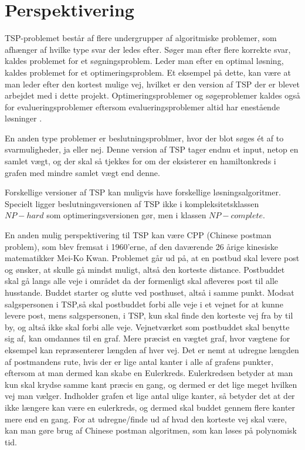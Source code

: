 \chapter{Perspektivering}
TSP-problemet består af flere undergrupper af algoritmiske problemer, som afhænger af hvilke type svar der ledes efter. Søger man efter flere korrekte svar, kaldes problemet for et søgningsproblem. Leder man efter en optimal løsning, kaldes problemet for et optimeringsproblem. Et eksempel på dette, kan være at man leder efter den kortest mulige vej, hvilket er den version af TSP der er blevet arbejdet med i dette projekt. Optimeringsproblemer og søgeproblemer kaldes også for evalueringsproblemer eftersom evalueringsproblemer altid har enestående løsninger .

En anden type problemer er beslutningsproblmer, hvor der blot søges ét af to svarmuligheder, ja eller nej. Denne version af TSP tager endnu et input, netop en samlet vægt, og der skal så tjekkes for om der eksisterer en hamiltonkreds i grafen med mindre samlet vægt end denne.

Forskellige versioner af TSP kan muligvis have forskellige løsningsalgoritmer. Specielt ligger beslutningsversionen af TSP ikke i kompleksitetsklassen $NP-hard$ som optimeringsversionen gør, men i klassen $NP-complete$.


En anden mulig perspektivering til TSP kan være CPP (Chinese postman problem), som blev fremsat i 1960'erne, af den daværende 26 årige kinesiske matematikker Mei-Ko Kwan. Problemet går ud på, at en postbud skal levere post og ønsker, at skulle gå mindst muligt, altså den korteste distance. Postbuddet skal gå langs alle veje i området da der formenligt skal afleveres post til alle husstande. Buddet starter og slutte ved posthuset,  altså i samme punkt. Modsat salgspersonen i TSP,så skal postbuddet  forbi alle veje i et vejnet for at kunne levere post, mens salgspersonen, i TSP, kun skal finde den korteste vej fra by til by, og altså ikke skal forbi alle veje. 
Vejnetværket som postbuddet skal benytte sig af, kan omdannes til en graf. Mere præcist en vægtet graf, hvor vægtene for eksempel kan repræsenterer længden af hver vej. 
Det er nemt at udregne længden af postmandens rute, hvis der er lige antal kanter i alle af grafens punkter, eftersom at man dermed kan skabe en Eulerkreds. Eulerkredsen betyder at man kun skal krydse samme kant præcis en gang, og dermed er det lige meget hvilken vej man vælger.   
Indholder grafen et lige antal ulige kanter, så betyder det at der ikke længere kan være en eulerkreds, og dermed skal buddet gennem flere kanter mere end en gang. For at udregne/finde ud af hvad den korteste vej skal være, kan man gøre brug af Chinese postman algoritmen, som kan løses på polynomisk tid.